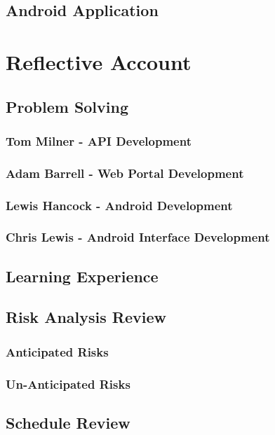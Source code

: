 \documentclass[11pt,a4paper]{report}
\begin{document}
\section{Android Application}

\chapter{Reflective Account}
\label{sec:reflective-account}
\section{Problem Solving}
\label{sec:problem-solving}
\subsection{Tom Milner - API Development}
\subsection{Adam Barrell - Web Portal Development}
\subsection{Lewis Hancock - Android Development}
\subsection{Chris Lewis - Android Interface Development}
\section{Learning Experience}
\label{sec:learning-experience}
\section{Risk Analysis Review}
\label{sec:risk-analysis-review}
\subsection{Anticipated Risks}
\label{sec:anticipated-risks}
\subsection{Un-Anticipated Risks}
\label{sec:unanticipated-risks}
\section{Schedule Review}
\label{sec:schedule-review}
\end{document}
